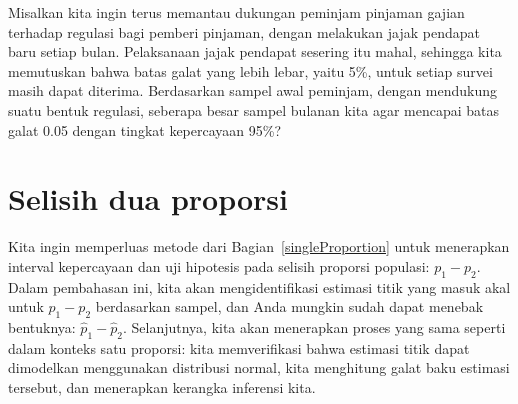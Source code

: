 
\begin{exercisewrap}
\begin{nexercise}
Misalkan kita ingin terus memantau dukungan
peminjam pinjaman gajian terhadap regulasi bagi pemberi pinjaman,
dengan melakukan jajak pendapat baru setiap bulan.
Pelaksanaan jajak pendapat sesering itu mahal, sehingga kita memutuskan
bahwa batas galat yang lebih lebar, yaitu 5\%, untuk setiap survei
masih dapat diterima.
Berdasarkan sampel awal peminjam, dengan
\paydayRegPerc{} mendukung suatu bentuk regulasi,
seberapa besar sampel bulanan kita agar mencapai batas
galat 0.05 dengan tingkat kepercayaan 95\%?\footnotemark
\end{nexercise}
\end{exercisewrap}


{}

\section{Selisih dua proporsi}
\label{differenceOfTwoProportions}

Kita ingin memperluas metode dari
Bagian~\ref{singleProportion}
untuk menerapkan interval kepercayaan dan uji hipotesis
pada selisih proporsi populasi:
\mbox{$p_1 - p_2$}.
Dalam pembahasan ini, kita akan mengidentifikasi
estimasi titik yang masuk akal untuk $p_1 - p_2$ berdasarkan sampel,
dan Anda mungkin sudah dapat menebak bentuknya:
$\hat{p}_1 - \hat{p}_2$.
%
Selanjutnya, kita akan menerapkan proses yang sama seperti dalam
konteks satu proporsi:
kita memverifikasi bahwa estimasi titik
dapat dimodelkan menggunakan distribusi normal,
kita menghitung galat baku estimasi tersebut, dan
menerapkan kerangka inferensi kita.


